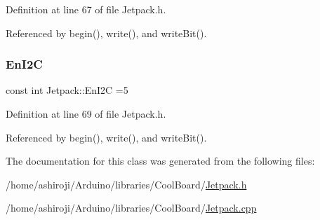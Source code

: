 Definition at line 67 of file Jetpack.\+h.



Referenced by begin(), write(), and write\+Bit().

\mbox{\label{classJetpack_a81df984fb4cea98c71aa1a1cfcdfe814}} 
\subsubsection{\texorpdfstring{En\+I2C}{EnI2C}}
{\footnotesize\ttfamily const int Jetpack\+::\+En\+I2C =5\hspace{0.3cm}{\ttfamily [private]}}



Definition at line 69 of file Jetpack.\+h.



Referenced by begin(), write(), and write\+Bit().



The documentation for this class was generated from the following files\+:\begin{DoxyCompactItemize}
\item 
/home/ashiroji/\+Arduino/libraries/\+Cool\+Board/\hyperlink{Jetpack_8h}{Jetpack.\+h}\item 
/home/ashiroji/\+Arduino/libraries/\+Cool\+Board/\hyperlink{Jetpack_8cpp}{Jetpack.\+cpp}\end{DoxyCompactItemize}
